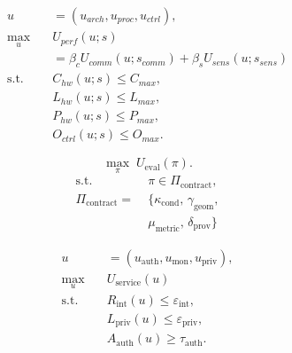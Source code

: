 \begin{equation}
    \begin{aligned}
        u                 & = (u_{arch},u_{proc},u_{ctrl}),                             \\
        \max_{u} \quad    & U_{perf}(u;s)                                               \\
                          & = \beta_c U_{comm}(u;s_{comm})+\beta_s U_{sens}(u;s_{sens}) \\
        \text{s.t.} \quad & C_{hw}(u;s) \le C_{max},                                    \\
                          & L_{hw}(u;s) \le L_{max},                                    \\
                          & P_{hw}(u;s) \le P_{max},                                    \\
                          & O_{ctrl}(u;s) \le O_{max}.
    \end{aligned}
\end{equation}

\begin{equation}
    \max_{\pi}\; U_{\mathrm{eval}}(\pi).
\end{equation}
\begin{equation}
    \begin{split}
        \text{s.t.}\;               & \pi \in \Pi_{\mathrm{contract}},                   \\
        \Pi_{\mathrm{contract}} =\; & \{\kappa_{\mathrm{cond}},\,\gamma_{\mathrm{geom}}, \\
                                    & \mu_{\mathrm{metric}},\,\delta_{\mathrm{prov}}\}
    \end{split}
\end{equation}

\begin{equation}
    \begin{aligned}
        u                 & = (u_{\mathrm{auth}},u_{\mathrm{mon}},u_{\mathrm{priv}}), \\
        \max_{u} \quad    & U_{\mathrm{service}}(u)                                   \\
        \text{s.t.} \quad & R_{\mathrm{int}}(u) \le \varepsilon_{\mathrm{int}},       \\
                          & L_{\mathrm{priv}}(u) \le \varepsilon_{\mathrm{priv}},     \\
                          & A_{\mathrm{auth}}(u) \ge \tau_{\mathrm{auth}}.
    \end{aligned}
\end{equation}

